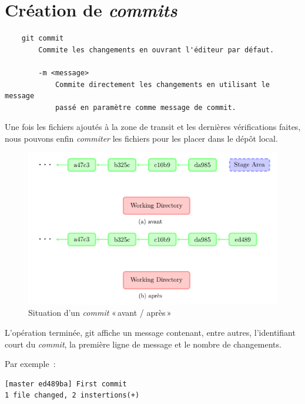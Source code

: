 \documentclass[a4paper,11pt]{style-esi/td}
\begin{document}
\section{Création de \textit{commits}}

\begin{colxbox}[colback=white,drop fuzzy shadow]
	\begin{verbatim}
	git commit
	    Commite les changements en ouvrant l'éditeur par défaut. 

	    -m <message>
	        Commite directement les changements en utilisant le message 
	        passé en paramètre comme message de commit. 
	\end{verbatim}
\end{colxbox}
\bigskip 

Une fois les fichiers ajoutés à la zone de transit et les dernières
vérifications faites, nous pouvons enfin \textit{commiter} les fichiers pour
les placer dans le dépôt local. 

\begin{figure}[h]
	\centering
	\includegraphics[width=\linewidth]{img/depot-git-commit.png}
	\caption{Situation d'un \textit{commit} « avant / après » }
	\label{fig:git-commit}
\end{figure}

L'opération terminée, git affiche un message contenant, entre autres, l'identifiant court du \textit{commit}, la première ligne de message et le nombre de changements. 

\pagebreak
Par exemple~:

\begin{verbatim}
[master ed489ba] First commit
1 file changed, 2 instertions(+)
\end{verbatim}
\end{document}
